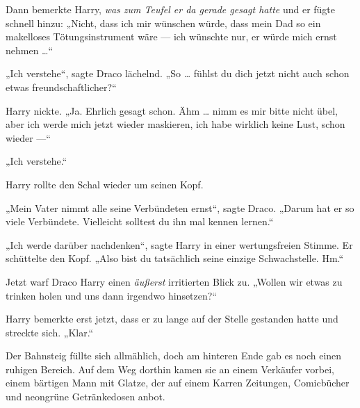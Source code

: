 Dann bemerkte Harry, \emph{was zum Teufel er da gerade gesagt hatte} und er fügte schnell hinzu:
„Nicht, dass ich mir wünschen würde, dass mein Dad so ein makelloses Tötungsinstrument wäre — ich wünschte nur, er würde mich ernst nehmen …“

„Ich verstehe“, sagte Draco lächelnd.
„So … fühlst du dich jetzt nicht auch schon etwas freundschaftlicher?“

Harry nickte.
„Ja. Ehrlich gesagt schon. Ähm … nimm es mir bitte nicht übel, aber ich werde mich jetzt wieder maskieren, ich habe wirklich keine Lust, schon wieder —“

„Ich verstehe.“

Harry rollte den Schal wieder um seinen Kopf.

„Mein Vater nimmt alle seine Verbündeten ernst“, sagte Draco.
„Darum hat er so viele Verbündete. Vielleicht solltest du ihn mal kennen lernen.“

„Ich werde darüber nachdenken“, sagte Harry in einer wertungsfreien Stimme. Er schüttelte den Kopf.
„Also bist du tatsächlich seine einzige Schwachstelle. Hm.“

Jetzt warf Draco Harry einen \emph{äußerst} irritierten Blick zu.
„Wollen wir etwas zu trinken holen und uns dann irgendwo hinsetzen?“

Harry bemerkte erst jetzt, dass er zu lange auf der Stelle gestanden hatte und streckte sich.
„Klar.“

Der Bahnsteig füllte sich allmählich, doch am hinteren Ende gab es noch einen ruhigen Bereich. Auf dem Weg dorthin kamen sie an einem Verkäufer vorbei, einem bärtigen Mann mit Glatze, der auf einem Karren Zeitungen, Comicbücher und neongrüne Getränkedosen anbot.

